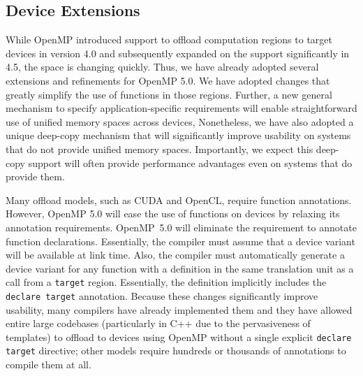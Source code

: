 \subsection{Device Extensions}
\label{sub:device_extensions}

While OpenMP introduced support to offload computation regions to target 
devices in version 4.0 and subsequently expanded on the support significantly 
in 4.5, the space is changing quickly. Thus, we have already adopted several
extensions and refinements for OpenMP 5.0. We have adopted changes that
greatly simplify the use of functions in those regions. Further, a new
general mechanism to specify application-specific requirements will enable 
straightforward use of unified memory spaces across devices, Nonetheless, 
we have also adopted a unique deep-copy mechanism that will significantly
improve usability on systems that do not provide unified memory spaces.
Importantly, we expect this deep-copy support will often provide performance 
advantages even on systems that do provide them.

Many offload models, such as CUDA and OpenCL, require function annotations. 
However, OpenMP 5.0 will ease the use of functions on devices by relaxing 
its annotation requirements. OpenMP~5.0 will eliminate the requirement to 
annotate function declarations. Essentially, the compiler must assume that 
a device variant will be available at link time. Also, the compiler must 
automatically generate a device variant for any function with a definition 
in the same translation unit as a call from a \texttt{target} region. 
Essentially, the definition implicitly includes the \texttt{declare target} 
annotation. Because these changes significantly improve usability, many 
compilers have already implemented them and they have allowed entire large 
codebases (particularly in C++ due to the pervasiveness of templates) to 
offload to devices using OpenMP without a single explicit \texttt{declare 
target} directive; other models require hundreds or thousands of annotations 
to compile them at all.

